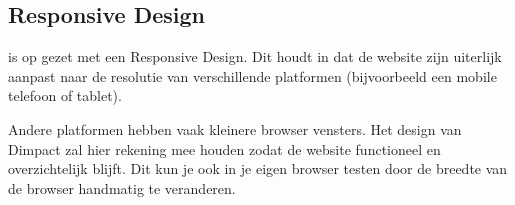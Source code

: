 \subsection{Responsive Design}\label{responsivedesign}

\drupalpath is op gezet met een Responsive Design. Dit houdt in dat de website zijn uiterlijk aanpast naar de resolutie van verschillende platformen (bijvoorbeeld een mobile telefoon of tablet). 

Andere platformen hebben vaak kleinere browser vensters. Het design van Dimpact zal hier rekening mee houden zodat de website functioneel en overzichtelijk blijft. Dit kun je ook in je eigen browser testen door de breedte van de browser handmatig te veranderen.
